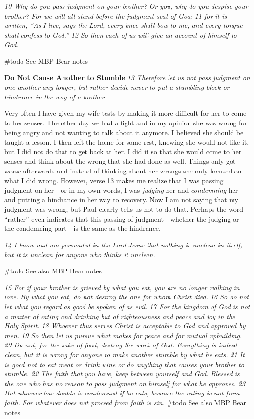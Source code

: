 \emph{10 Why do you pass judgment on your brother? Or you, why do you
despise your brother? For we will all stand before the judgment seat of
God; 11 for it is written,} \emph{``As I live, says the Lord, every knee
shall bow to me,\emph{ }and every tongue shall confess to God.''}
\emph{12 So then each of us will give an account of himself to God.}

\#todo See MBP Bear notes

\textbf{Do Not Cause Another to Stumble} \emph{13 Therefore let us not
pass judgment on one another any longer, but rather decide never to put
a stumbling block or hindrance in the way of a brother.}

Very often I have given my wife tests by making it more difficult for
her to come to her senses. The other day we had a fight and in my
opinion she was wrong for being angry and not wanting to talk about it
anymore. I believed she should be taught a lesson. I then left the home
for some rest, knowing she would not like it, but I did not do that to
get back at her. I did it so that she would come to her senses and think
about the wrong that she had done as well. Things only got worse
afterwards and instead of thinking about her wrongs she only focused on
what I did wrong. However, verse 13 makes me realize that I was passing
judgment on her---or in my own words, I was \emph{judging} her and
\emph{condemning} her---and putting a hindrance in her way to recovery.
Now I am not saying that my judgment was wrong, but Paul clearly tells
us not to do that. Perhaps the word ``rather'' even indicates that this
passing of judgment---whether the judging or the condemning part---is
the same as the hindrance.

\emph{14 I know and am persuaded in the Lord Jesus that nothing is
unclean in itself, but it is unclean for anyone who thinks it unclean.}

\#todo See also MBP Bear notes

\emph{15 For if your brother is grieved by what you eat, you are no
longer walking in love. By what you eat, do not destroy the one for whom
Christ died. 16 So do not let what you regard as good be spoken of as
evil. 17 For the kingdom of God is not a matter of eating and drinking
but of righteousness and peace and joy in the Holy Spirit. 18 Whoever
thus serves Christ is acceptable to God and approved by men. 19 So then
let us pursue what makes for peace and for mutual upbuilding.} \emph{20
Do not, for the sake of food, destroy the work of God. Everything is
indeed clean, but it is wrong for anyone to make another stumble by what
he eats. 21 It is good not to eat meat or drink wine or do anything that
causes your brother to stumble. 22 The faith that you have, keep between
yourself and God. Blessed is the one who has no reason to pass judgment
on himself for what he approves. 23 But whoever has doubts is condemned
if he eats, because the eating is not from faith. For whatever does not
proceed from faith is sin.} \#todo See also MBP Bear notes

